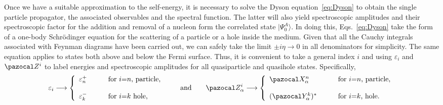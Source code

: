  Once we have  a suitable approximation to the self-energy, it is necessary to solve the Dyson equation~\eqref{eq:Dyson}
 to obtain the single particle propagator, the  associated  observables and the  spectral function. The latter will also yield spectroscopic amplitudes and their spectroscopic factor for the addition and removal of a nucleon form the correlated state $|\Psi^A_0\rangle$.  In doing this, Eqs.~\eqref{eq:Dyson} take the form of a one-body Schr\"odinger equation for the scattering of a particle or a hole inside the medium. Given that all the Cauchy integrals associated with Feynman diagrams have been carried out, we can safely take the limit $\pm i \eta \rightarrow 0$ in all denominators for simplicity. The same equation applies to states both above and below the Fermi surface.
 Thus, it is convenient to take a general index $i$ and using $\varepsilon_i$ and $\pazocal Z^i$ to label energies and spectroscopic amplitudes for all quasiparticle and quasihole states. Specifically,
 \begin{equation}
\varepsilon_i \longrightarrow \left\{
\begin{array}{lcl}
\varepsilon_n^+ & \quad & \hbox{for $i$=$n$, particle,}  \\ ~ \\
\varepsilon_k^- &  & \hbox{for $i$=$k$ hole,}
\end{array} \right.
\qquad \hbox{and} \qquad
\pazocal Z^i_\alpha  \longrightarrow \left\{
\begin{array}{lcl}
\pazocal X^n_\alpha & \quad & \hbox{for $i$=$n$, particle,} \\ ~ \\
(\pazocal Y^k_\alpha)^* &  & \hbox{for $i$=$k$, hole.}
\end{array} \right.
\label{eq:Z_ampl}
\end{equation}

